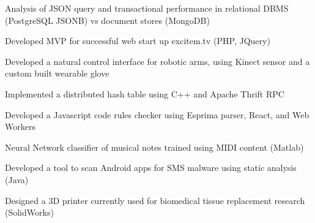 

\begin{cventries}

\vspace{-5mm}

  \cventry
    {}
    {}
    {}
    {}
    {
      \begin{cvitems} %
        \item {Analysis of JSON query and transactional performance in relational DBMS (PostgreSQL JSONB) vs document stores (MongoDB)}
        \item {Developed MVP for successful web start up excitem.tv (PHP, JQuery)}
        \item {Developed a natural control interface for robotic arms, using Kinect sensor and a custom built wearable glove}
        \item {Implemented a distributed hash table using C++ and Apache Thrift RPC}
        \item {Developed a Javascript code rules checker using Esprima parser, React, and Web Workers}
        \item {Neural Network classifier of musical notes trained using MIDI content (Matlab)}
        \item {Developed a tool to scan Android apps for SMS malware using static analysis (Java)}
        \item {Designed a 3D printer currently used for biomedical tissue replacement research (SolidWorks)}
      \end{cvitems}
	}

\end{cventries}
